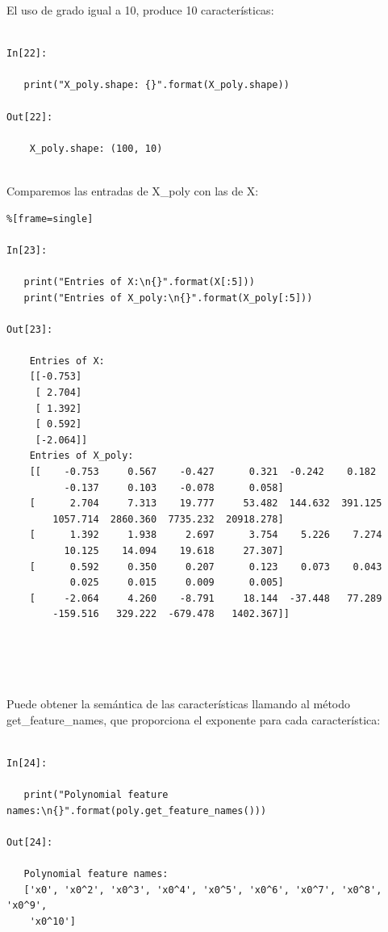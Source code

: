 El uso de  grado igual a  10, produce 10 características:

\begin{lstlisting}

In[22]:

   print("X_poly.shape: {}".format(X_poly.shape))

Out[22]:

    X_poly.shape: (100, 10)  
  
  \end{lstlisting}    
 
 Comparemos las entradas de {\ttfamily X\_poly} con las de X:\\
 
 \begin{lstlisting}%[frame=single]
 
In[23]:

   print("Entries of X:\n{}".format(X[:5]))
   print("Entries of X_poly:\n{}".format(X_poly[:5]))

Out[23]:
   
    Entries of X:
    [[-0.753]
     [ 2.704]
     [ 1.392]
     [ 0.592]
     [-2.064]]
    Entries of X_poly:
    [[    -0.753     0.567    -0.427      0.321  -0.242    0.182
          -0.137     0.103    -0.078      0.058]
    [      2.704     7.313    19.777     53.482  144.632  391.125
        1057.714  2860.360  7735.232  20918.278]
    [      1.392     1.938     2.697      3.754    5.226    7.274
          10.125    14.094    19.618     27.307]
    [      0.592     0.350     0.207      0.123    0.073    0.043
           0.025     0.015     0.009      0.005]
    [     -2.064     4.260    -8.791     18.144  -37.448   77.289
        -159.516   329.222  -679.478   1402.367]]

	



\end{lstlisting}



	Puede obtener la semántica de las características llamando al método {\ttfamily get\_feature\_names}, que proporciona el exponente para cada característica:
	
\begin{lstlisting}	
		
In[24]:

   print("Polynomial feature names:\n{}".format(poly.get_feature_names()))
   
Out[24]:
	
   Polynomial feature names:
   ['x0', 'x0^2', 'x0^3', 'x0^4', 'x0^5', 'x0^6', 'x0^7', 'x0^8', 'x0^9',
    'x0^10']
	
\end{lstlisting}
	

